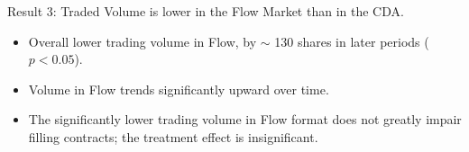 \documentclass[10pt]{beamer}
\begin{document}
\begin{frame}{Result 3: Traded Volume is lower in the Flow Market than in the CDA.}
\begin{itemize}
\item Overall lower trading volume in Flow, by $\sim$ 130 shares in later periods ($p < 0.05$).
\item Volume in Flow trends significantly upward over time.
\item The significantly lower trading volume in Flow format does not greatly impair filling contracts; the treatment effect is insignificant.
\end{itemize}   
\end{frame}





\end{document}
